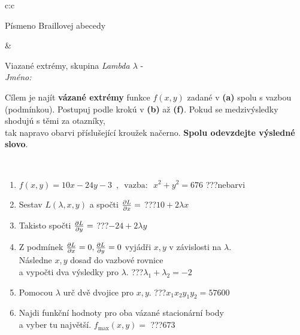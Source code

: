 \documentclass[10pt]{report}
\begin{document}
\begin{tabular}{c:c}
\begin{minipage}[c][104.5mm][t]{0.5\linewidth}
\begin{center}
\begin{minipage}{0.20\linewidth}
\begin{center}
{\small Písmeno Braillovej abecedy}
\end{center}
\end{minipage}
\end{center}
\end{minipage}
&
\begin{minipage}[c][104.5mm][t]{0.5\linewidth}
\begin{center}
\vspace{7mm}
{\huge Viazané extrémy, skupina \textit{Lambda $\lambda$} -}\\[5mm]
\textit{Jméno:}\phantom{xxxxxxxxxxxxxxxxxxxxxxxxxxxxxxxxxxxxxxxxxxxxxxxxxxxxxxxxxxxxxxxxx}\\[5mm]
\begin{minipage}{0.95\linewidth}
\begin{center}
Cílem je najít \textbf{vázané extrémy} funkce $f(x,y)$ zadané v \textbf{(a)} spolu s vazbou (podmínkou). Postupuj podle krokú v \textbf{(b)} až \textbf{(f)}. Pokud se medzivýsledky shodujú s těmi za otazníky,\\tak napravo obarvi příslušející kroužek načerno. \textbf{Spolu odevzdejte výsledné slovo}.
\end{center}
\end{minipage}
\\[1mm]
\begin{minipage}{0.79\linewidth}
\begin{center}
\begin{varwidth}{\linewidth}
\begin{enumerate}
\normalsize
\item $f(x,y)=10x-24y-3 \enspace , \enspace \mathrm{vazba:} \enspace x^2+y^2=676$\quad \dotfill\; ???\;\dotfill \quad nebarvi
\item Sestav $L(\lambda,x,y)$ a spočti $\pdv{L}{x}=$\quad \dotfill\; ???\;\dotfill \quad $10+2\lambda x$
\item Takisto spočti $\pdv{L}{y}=$\quad \dotfill\; ???\;\dotfill \quad $-24+2\lambda y$
\item Z podmínek $\pdv{L}{x}=0 , \pdv{L}{y}=0$ vyjádři $x,y$ v závislosti na $\lambda$.\\ \phantom{xxxxxx}Následne $x,y$ dosaď do vazbové rovnice\\ \phantom{xxxxxx}a vypočti dva výsledky pro $\lambda$.\quad \dotfill\; ???\;\dotfill \quad $\lambda_1+\lambda_2=-2$
\item Pomocou $\lambda$ urč dvě dvojice pro $x,y$.\quad \dotfill\; ???\;\dotfill \quad $x_1 x_2 y_1 y_2=57600$
\item Najdi funkční hodnoty pro oba vázané stacionární body\\ \phantom{xxxxxx}a vyber tu najvětší. $f_{\text{max}}(x,y)=$\quad \dotfill\; ???\;\dotfill \quad $673$

\end{enumerate}
\end{varwidth}
\end{center}
\end{minipage}
\end{center}
\end{minipage}
\end{tabular}
\end{document}
